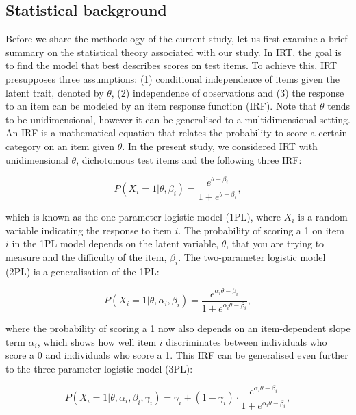 \documentclass[Royal,sageapa,times,doublespace]{sagej}
\begin{document}
\subsection{Statistical background}
Before we share the methodology of the current study, let us first examine a brief summary on the statistical theory associated with our study. In IRT, the goal is to find the model that best describes scores on test items. To achieve this, IRT presupposes three assumptions: (1) conditional independence of items given the latent trait, denoted by $\theta$, (2) independence of observations and (3) the response to an item can be modeled by an item response function (IRF). Note that $\theta$ tends to be unidimensional, however it can be generalised to a multidimensional setting. An IRF is a mathematical equation that relates the probability to score a certain category on an item given $\theta$. In the present study, we considered IRT with unidimensional $\theta$, dichotomous test items and the following three IRF:

\begin{equation}
P(X_i = 1 | \theta, \beta_{i}) = \frac{e^{\theta - \beta_{i}}}{1 + e^{\theta - \beta_{i}}},
\end{equation}

which is known as the one-parameter logistic model (1PL), where $X_i$ is a random variable indicating the response to item $i$. The probability of scoring a 1 on item $i$ in the 1PL model depends on the latent variable, $\theta$, that you are trying to measure and the difficulty of the item, $\beta_i$. The two-parameter logistic model (2PL) is a generalisation of the 1PL:

\begin{equation}
P(X_i = 1 | \theta, \alpha_{i}, \beta_{i}) = \frac{e^{\alpha_{i}\theta - \beta_{i}}}{1 + e^{\alpha_{i}\theta - \beta_{i}}},
\end{equation}

where the probability of scoring a 1 now also depends on an item-dependent slope term $\alpha_i$, which shows how well item $i$ discriminates between individuals who score a 0 and individuals who score a 1. This IRF can be generalised even further to the three-parameter logistic model (3PL):

\begin{equation}
P(X_i = 1 | \theta, \alpha_{i}, \beta_{i}, \gamma_{i}) = \gamma_{i} + (1 - \gamma_{i}) \cdot 
\frac{e^{\alpha_{i}\theta - \beta_{i}}}{1 + e^{\alpha_{i}\theta - \beta_{i}}},
\end{equation}
\end{document}
